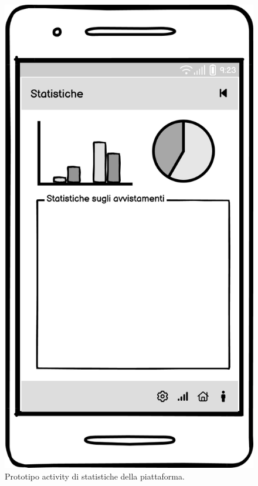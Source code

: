 \documentclass[a4paper,final,12pt]{report}
\begin{document}
\begin{figure}[hbtp]
\centering
\includegraphics[scale=0.50]{img_concettuale/stat_mob.png}
\caption{Prototipo activity di statistiche della piattaforma.}
\end{figure}
\end{document}
